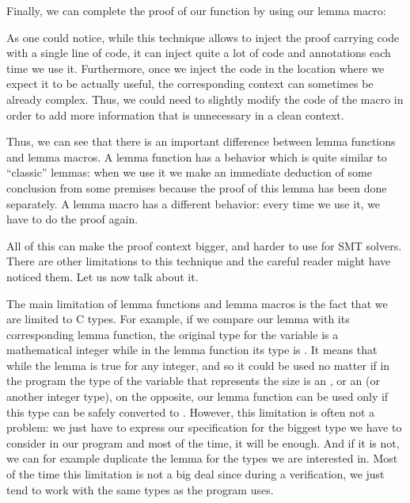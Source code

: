 Finally, we can complete the proof of our function  by using
our lemma macro:






As one could notice, while this technique allows to inject the proof carrying
code with a single line of code, it can inject quite a lot of code and
annotations each time we use it. Furthermore, once we inject the code in the
location where we expect it to be actually useful, the corresponding context
can sometimes be already complex. Thus, we could need to slightly modify the
code of the macro in order to add more information that is unnecessary in a
clean context.


Thus, we can see that there is an important difference between lemma functions
and lemma macros. A lemma function has a behavior which is quite similar to
``classic'' lemmas: when we use it we make an immediate deduction of some
conclusion from some premises because the proof of this lemma has been done
separately. A lemma macro has a different behavior: every time we use it,
we have to do the proof again.


All of this can make the proof context bigger, and harder to use for SMT solvers.
There are other limitations to this technique and the careful reader might have
noticed them. Let us now talk about it.






The main limitation of lemma functions and lemma macros is the fact that we are
limited to C types. For example, if we compare our lemma
 with its corresponding lemma
function, the original type for the variable  is a mathematical
integer while in the lemma function its type is . It means
that while the lemma is true for any integer, and so it could be used no matter
if in the program the type of the variable that represents the size is an
, or an  (or another integer type), on the
opposite, our lemma function can be used only if this type can be safely
converted to . However, this limitation is often not a
problem: we just have to express our specification for the biggest type we have
to consider in our program and most of the time, it will be enough. And if it is
not, we can for example duplicate the lemma for the types we are interested in.
Most of the time this limitation is not a big deal since during a
verification, we just tend to work with the same types as the program uses.




